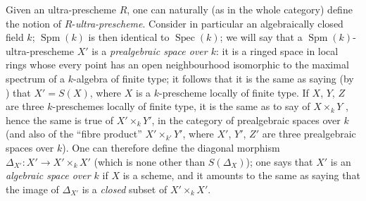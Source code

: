\begin{env}[10.10.2]
\label{IV.10.10.2}
Given an ultra-prescheme $R$, one can naturally (as in the whole category) define the notion of $R$-\emph{ultra-prescheme}.
Consider in particular an algebraically closed field $k$; $\operatorname{Spm}(k)$ is then identical to $\operatorname{Spec}(k)$; we will say that a $\operatorname{Spm}(k)$-ultra-prescheme $X'$ is a \emph{prealgebraic space over $k$}: it is a ringed space in local rings whose every point has an open neighbourhood isomorphic to the maximal spectrum of a $k$-algebra of finite type; it follows that it is the same as saying (by ) that $X'=S(X)$, where $X$ is a $k$-prescheme locally of finite type.
If $X$, $Y$, $Z$ are three $k$-preschemes locally of finite type, it is the same as to say of $X\times_k Y$ , hence the same is true of $X'\times_k Y'$, in the category of prealgebraic spaces over $k$ (and also of the ``fibre product'' $X'\times_{k'}Y'$, where $X'$, $Y'$, $Z'$ are three prealgebraic spaces over $k$).
One can therefore define the diagonal morphism $\Delta_{X'}:X'\to X'\times_k X'$ (which is none other than $S(\Delta_X)$); one says that $X'$ is an \emph{algebraic space over $k$} if $X$ is a scheme, and it amounts to the same as saying that the image of $\Delta_{X'}$ is a \emph{closed} subset of $X'\times_k X'$.
\end{env}

